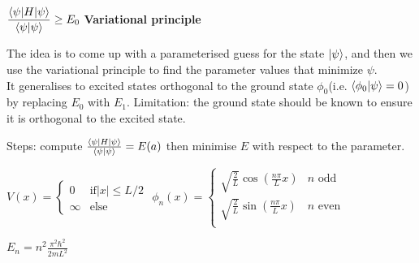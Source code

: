 \begin{squishlist}
    \item $\dfrac{\braket{\psi | H | \psi}}{\braket{\psi|\psi}} \geq E_0$ \quad \textbf{Variational principle}
    \item The idea is to come up with a parameterised guess for the state $\ket{\psi}$, and then we use the variational principle to find the parameter values that minimize $\psi$.\\
    It generalises to excited states orthogonal to the ground state $\phi_0$(i.e. $\braket{\phi_0|\psi} = 0$) by replacing $E_0$ with $E_1$.
    Limitation: the ground state should be known to ensure it is orthogonal to the excited state.
    \item Steps: compute $\frac{\braket{\psi | H | \psi}}{\braket{\psi|\psi}} = E(a)$ then minimise $E$ with respect to the parameter.
\end{squishlist}


\columnbreak

\begin{squishlist}
    
    \item $V(x) = \begin{cases}
        0 & \text{if} |x| \leq L/2 \\ \infty & \text{else}
    \end{cases}$
    \qquad
    $\phi_n(x) = \begin{cases}
        \sqrt{\frac{2}{L}} \cos(\frac{n\pi }{L} x) & n \text{ odd} \\
        \sqrt{\frac{2}{L}} \sin(\frac{n\pi }{L} x) & n \text{ even} \\
    \end{cases}$
    
    \item $E_n = n^2 \frac{\pi^2 \hbar^2}{2 m L^2}$
\end{squishlist}

